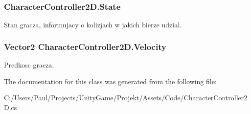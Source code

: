 \subsubsection[{State}]{ Character\+Controller2\+D.\+State\hspace{0.3cm}{\ttfamily [get]}}\label{class_character_controller2_d_a5e65ffc5d4f73920480727f2bf58e978}


Stan gracza, informujacy o kolizjach w jakich bierze udzial. 

\hypertarget{class_character_controller2_d_af48e21d4114c7f48f97fe924956b3d10}{}
\subsubsection[{Velocity}]{\setlength{\rightskip}{0pt plus 5cm}Vector2 Character\+Controller2\+D.\+Velocity\hspace{0.3cm}{\ttfamily [get]}}\label{class_character_controller2_d_af48e21d4114c7f48f97fe924956b3d10}


Predkosc gracza. 



The documentation for this class was generated from the following file\+:\begin{DoxyCompactItemize}
\item 
C\+:/\+Users/\+Paul/\+Projects/\+Unity\+Game/\+Projekt/\+Assets/\+Code/Character\+Controller2\+D.\+cs\end{DoxyCompactItemize}
